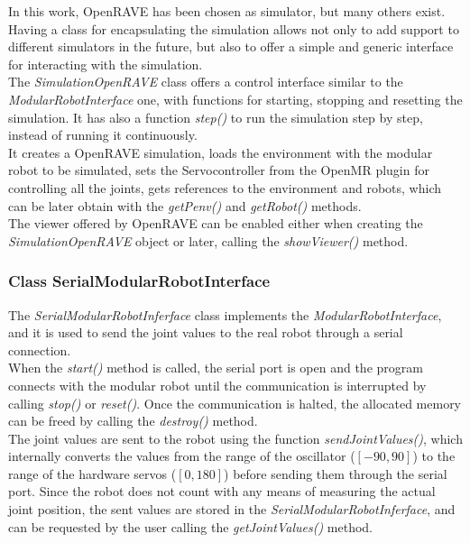 In this work, OpenRAVE has been chosen as simulator, but many others exist. Having a class for encapsulating the simulation allows not only to add support to different simulators in the future, but also to offer a simple and generic interface for interacting with the simulation.\\

The \emph{SimulationOpenRAVE} class offers a control interface similar to the \emph{ModularRobotInterface} one, with functions for starting, stopping and resetting the simulation. It has also a function \emph{step()} to run the simulation step by step, instead of running it continuously.\\

It creates a OpenRAVE simulation, loads the environment with the modular robot to be simulated, sets the Servocontroller from the OpenMR plugin for controlling all the joints, gets references to the environment and robots, which can be later obtain with the \emph{getPenv()} and \emph{getRobot()} methods.\\

The viewer offered by OpenRAVE can be enabled either when creating the \emph{SimulationOpenRAVE} object or later, calling the \emph{showViewer()} method.\\

\subsubsection{Class SerialModularRobotInterface}
\label{software_class_serialmodularrobotinterface}

The \emph{SerialModularRobotInferface} class implements the \emph{ModularRobotInterface}, and it is used to send the joint values to the real robot through a serial connection.\\

When the \emph{start()} method is called, the serial port is open and the program connects with the modular robot until the communication is interrupted by calling \emph{stop()} or \emph{reset()}. Once the communication is halted, the allocated memory can be freed by calling the \emph{destroy()} method.\\

The joint values are sent to the robot using the function \emph{sendJointValues()}, which internally converts the values from the range of the oscillator ($[-90,90]$) to the range of the hardware servos ($[0,180]$) before sending them through the serial port. Since the robot does not count with any means of measuring the actual joint position, the sent values are stored in the \emph{SerialModularRobotInferface}, and can be requested by the user calling the \emph{getJointValues()} method.\\

